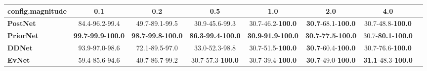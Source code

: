 \begin{tabular}{lccccccc}
\toprule
\textbf{config.magnitude} &                                         0.1 &                                         0.2 &                                         0.5 &                                         1.0 &                                         2.0 &                                4.0 \\
\midrule
\textbf{PostNet } &                              84.4-96.2-99.4 &                              49.7-89.1-99.5 &                              30.9-45.6-99.3 &                    30.7-46.2-\textbf{100.0} &           \textbf{30.7}-68.1-\textbf{100.0} &           30.7-48.8-\textbf{100.0} \\
\textbf{PriorNet} &  \textbf{99.7}-\textbf{99.9}-\textbf{100.0} &  \textbf{98.7}-\textbf{99.8}-\textbf{100.0} &  \textbf{86.3}-\textbf{99.4}-\textbf{100.0} &  \textbf{30.9}-\textbf{91.9}-\textbf{100.0} &  \textbf{30.7}-\textbf{77.5}-\textbf{100.0} &  30.7-\textbf{80.1}-\textbf{100.0} \\
\textbf{DDNet   } &                              93.9-97.0-98.6 &                              72.1-89.5-97.0 &                              33.0-52.3-98.8 &                    30.7-51.5-\textbf{100.0} &           \textbf{30.7}-60.4-\textbf{100.0} &           30.7-76.6-\textbf{100.0} \\
\textbf{EvNet   } &                              59.4-85.6-94.6 &                              40.7-86.7-99.2 &                    30.7-57.3-\textbf{100.0} &                    30.7-39.4-\textbf{100.0} &           \textbf{30.7}-49.0-\textbf{100.0} &  \textbf{31.1}-48.3-\textbf{100.0} \\
\bottomrule
\end{tabular}
